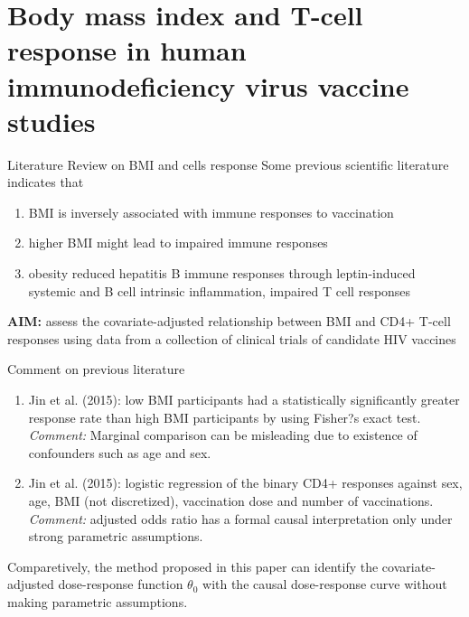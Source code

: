 \documentclass{beamer}
\begin{document}
\section{Body mass index and T-cell response in human immunodeficiency virus vaccine studies}

\begin{frame}{Literature Review on BMI and cells response}
Some previous scientific literature indicates that
\begin{enumerate}
	\item BMI is inversely associated with immune responses to vaccination

	\item higher BMI might lead to impaired	immune responses

	\item obesity reduced hepatitis B immune responses through leptin-induced systemic and B cell intrinsic inflammation, impaired T cell responses
\end{enumerate}
\textbf{AIM:} assess the covariate-adjusted relationship between BMI and CD4+ T-cell responses using data from a collection of clinical trials of candidate HIV vaccines
\end{frame}

\begin{frame}{Comment on previous literature}
\begin{enumerate}
	\item Jin et al. (2015): low BMI participants had a statistically significantly greater response rate than high
	BMI participants by using Fisher?s exact test.\\
	\textit{Comment:} Marginal comparison can be misleading due to existence of confounders such as age and sex.

	\item Jin
	et al. (2015): logistic regression of the binary CD4+ responses against sex, age,
	BMI (not discretized), vaccination dose and number of vaccinations.\\
	\textit{Comment:} adjusted odds ratio has a formal causal interpretation only under strong parametric
	assumptions.
\end{enumerate}
Comparetively, the method proposed in this paper can identify the covariate-adjusted dose-response function
$\theta_0$ with the causal dose-response curve without making parametric assumptions.
\end{frame}
\end{document}
